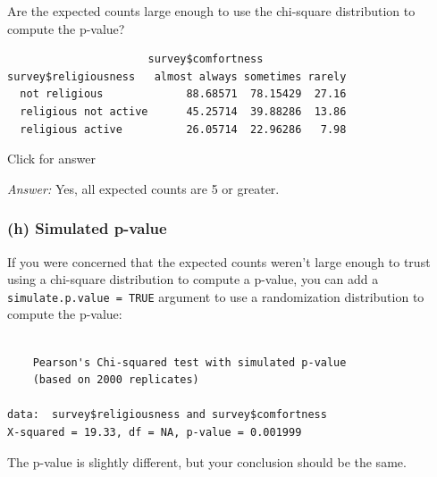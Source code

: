 \documentclass[
]{book}
\newenvironment{Shaded}{\begin{snugshade}}{\end{snugshade}}
\newcommand{\AttributeTok}[1]{\textcolor[rgb]{0.77,0.63,0.00}{#1}}
\newcommand{\ConstantTok}[1]{\textcolor[rgb]{0.00,0.00,0.00}{#1}}
\newcommand{\FunctionTok}[1]{\textcolor[rgb]{0.00,0.00,0.00}{#1}}
\newcommand{\NormalTok}[1]{#1}
\newcommand{\SpecialCharTok}[1]{\textcolor[rgb]{0.00,0.00,0.00}{#1}}
\begin{document}
Are the expected counts large enough to use the chi-square distribution to compute the p-value?

\begin{Shaded}
\end{Shaded}

\begin{verbatim}
                      survey$comfortness
survey$religiousness   almost always sometimes rarely
  not religious             88.68571  78.15429  27.16
  religious not active      45.25714  39.88286  13.86
  religious active          26.05714  22.96286   7.98
\end{verbatim}

Click for answer

\emph{Answer:} Yes, all expected counts are 5 or greater.

\hypertarget{h-simulated-p-value}{%
\subsubsection{(h) Simulated p-value}\label{h-simulated-p-value}}

If you were concerned that the expected counts weren't large enough to trust using a chi-square distribution to compute a p-value, you can add a \texttt{simulate.p.value\ =\ TRUE} argument to use a randomization distribution to compute the p-value:

\begin{Shaded}
\end{Shaded}

\begin{verbatim}

    Pearson's Chi-squared test with simulated p-value
    (based on 2000 replicates)

data:  survey$religiousness and survey$comfortness
X-squared = 19.33, df = NA, p-value = 0.001999
\end{verbatim}

The p-value is slightly different, but your conclusion should be the same.
\end{document}
